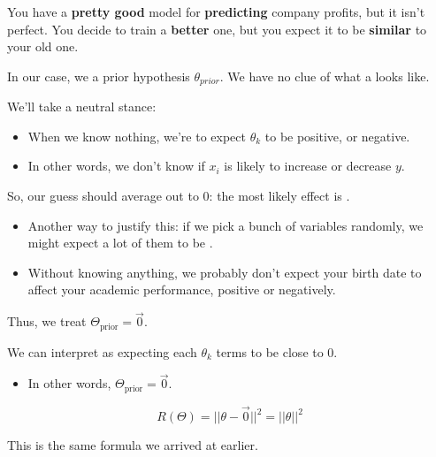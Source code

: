         \miniex You have a \textbf{pretty good} model for \textbf{predicting} company profits, but it isn't perfect. You decide to train a \textbf{better} one, but you expect it to be \textbf{similar} to your old one.

        \phantom{}

        In our case, we  a prior hypothesis $\theta_{prior}$. We have no clue of what a  looks like.

        We'll take a neutral stance:

        \begin{itemize}
            \item When we know nothing, we're  to expect $\theta_k$ to be positive, or negative. 
            \item In other words, we don't know if $x_i$ is likely to increase or decrease $y$.
        \end{itemize}

        So, our guess should average out to 0: the most likely effect is .

        \begin{itemize}
            \item Another way to justify this: if we pick a bunch of variables randomly, we might expect a lot of them to be .
            \item \miniex Without knowing anything, we probably don't expect your birth date to affect your academic performance, positive or negatively.
        \end{itemize}

        Thus, we treat $\Theta_{\text{prior}} = \vec{0}$.\\

        \begin{concept}
            We can interpret  as expecting each $\theta_k$ terms to be close to 0.
            
            \begin{itemize}
                \item In other words, $\Theta_{\text{prior}}=\vec{0}$.
            \end{itemize}

            \begin{equation*}
                R(\Theta) = ||\theta-\vec{0}||^2 = ||\theta||^2 
            \end{equation*}

            This is the same formula we arrived at earlier.
        \end{concept}
        
